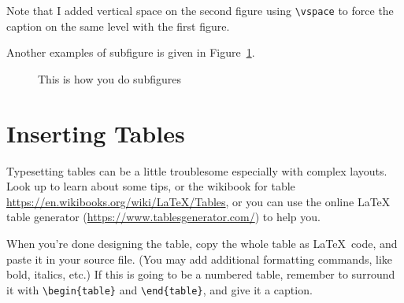 Note that I added vertical space on the second figure using \verb|\vspace| to force the caption on the same level with the first figure. 

Another examples of subfigure is given in Figure~\ref{fig:subfigureexample}.

\begin{figure}[H]\singlespacing
	\begin{minipage}{0.49\textwidth}
		\centering
		\vspace{7.4pc}
	\end{minipage}	
	\begin{minipage}{0.49\textwidth}
		\centering
	\end{minipage}		
	\begin{minipage}{\textwidth}
		\centering
	\end{minipage}
	\caption{This is how you do subfigures}
	\label{fig:subfigureexample}
\end{figure}

\section{Inserting Tables}

Typesetting tables can be a little troublesome especially with complex layouts.  Look up \citet{roberts} to learn about some tips, or the wikibook for table \url{https://en.wikibooks.org/wiki/LaTeX/Tables}, or you can use the online \LaTeX{} table generator (\url{https://www.tablesgenerator.com/}) to help you.

When you're done designing the table, copy the whole table as \LaTeX\ code, and paste it in your source file.  (You may add additional formatting commands, like bold, italics, etc.)  If this is going to be a numbered table, remember to surround it with \verb|\begin{table}| and \verb|\end{table}|, and give it a caption. 

